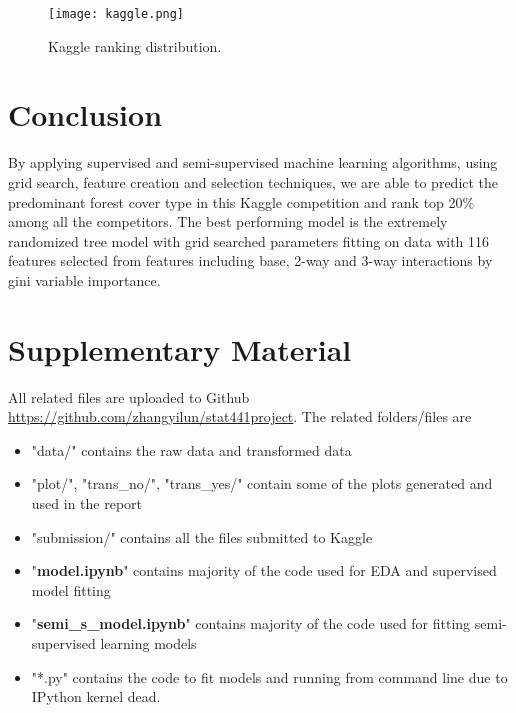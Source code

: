 \documentclass[11pt]{article}
\begin{document}
\begin{figure}[ht]
\label{kaggle_rank}
\begin{center}
\texttt{[image: kaggle.png]}
\end{center}
\caption{Kaggle ranking distribution.}
\end{figure}




\section{Conclusion}
By applying supervised and semi-supervised machine learning algorithms, using grid search, feature creation and selection techniques, we are able to predict the predominant forest cover type in this Kaggle competition and rank top 20$\%$ among all the competitors. The best performing model is the extremely randomized tree model with grid searched parameters fitting on data with 116 features selected from features including base, 2-way and 3-way interactions by gini variable importance.


\newpage

\section{Supplementary Material}
All related files are uploaded to Github \href{https://github.com/zhangyilun/stat441project}{https://github.com/zhangyilun/stat441project}. The related folders/files are
\begin{itemize}
\item "data/" contains the raw data and transformed data
\item "plot/", "trans\_no/", "trans\_yes/" contain some of the plots generated and used in the report
\item "submission/" contains all the files submitted to Kaggle
\item "\textbf{model.ipynb}" contains majority of the code used for EDA and supervised model fitting
\item "\textbf{semi\_s\_model.ipynb}" contains majority of the code used for fitting semi-supervised learning models
\item "*.py" contains the code to fit models and running from command line due to IPython kernel dead.
\end{itemize}
\end{document}
